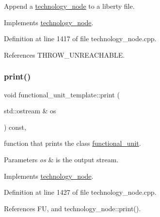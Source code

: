 Append a \hyperlink{structtechnology__node}{technology\+\_\+node} to a liberty file. 



Implements \hyperlink{structtechnology__node_a7e56b3bd8c693bb664fae9e5538b2526}{technology\+\_\+node}.



Definition at line 1417 of file technology\+\_\+node.\+cpp.



References T\+H\+R\+O\+W\+\_\+\+U\+N\+R\+E\+A\+C\+H\+A\+B\+LE.

\mbox{\label{structfunctional__unit__template_a4618e5113fff69a045ebc7f974e843b2}} 
\subsubsection{\texorpdfstring{print()}{print()}}
{\footnotesize\ttfamily void functional\+\_\+unit\+\_\+template\+::print (\begin{DoxyParamCaption}\item[{std\+::ostream \&}]{os }\end{DoxyParamCaption}) const\hspace{0.3cm}{\ttfamily [override]}, {\ttfamily [virtual]}}



function that prints the class \hyperlink{structfunctional__unit}{functional\+\_\+unit}. 


\begin{DoxyParams}{Parameters}
{\em os} & is the output stream. \\
\hline
\end{DoxyParams}


Implements \hyperlink{structtechnology__node_a44f347bae9b9b59726f323b5a6ad9ebf}{technology\+\_\+node}.



Definition at line 1427 of file technology\+\_\+node.\+cpp.



References FU, and technology\+\_\+node\+::print().

